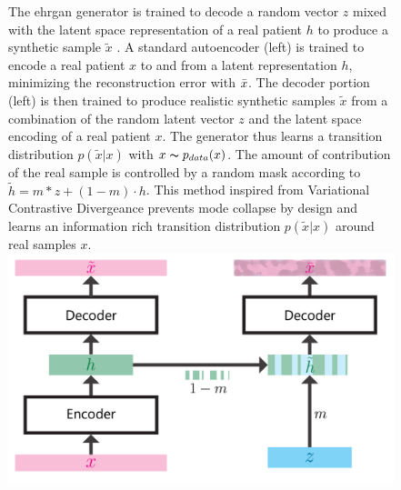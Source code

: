 \begin{figure}
    \footnotesize
\noindent
{}
\begin{tcolorbox}[sidebyside,arc=0.5mm, 
    colback=MidnightBlue!10!white, 
    coltext=MidnightBlue!90!black,  
    colframe=MidnightBlue!90!black,
    colbacktitle=MidnightBlue!80,
    leftrule=0mm,
    rightrule=0mm, 
    toprule=0mm, 
    bottomrule=0mm,
    box align=top,
    title={\begin{panel}Transitional distribution \label{pan:transitional}\end{panel}}]

The \gls{ehrgan} generator is trained to decode a random vector $z$ mixed with the latent space representation of a real patient $h$ to produce a synthetic sample $\tilde{x}$ \cite{Che_2017}. A standard autoencoder (left) is trained to encode a real patient $x$ to and from a latent representation $h$, minimizing the reconstruction error with $\Bar{x}$. The decoder portion (left) is then trained to produce realistic synthetic samples $\tilde{x}$ from a combination of the random latent vector $z$ and the latent space encoding of a real patient $x$. The generator thus learns a transition distribution $p(\tilde{x}|x)$ with $x \thicksim p_{data}(x)$. The amount of contribution of the real sample is controlled by a random mask according to $\tilde{h} =m * z + (1 - m) \cdot h$. This method inspired from Variational Contrastive Divergeance prevents mode collapse by design and  learns an information rich transition distribution $p(\tilde{x}|x)$ around real samples $x$.
\tcblower
\includegraphics[width=1\columnwidth]{assets/transitional}
\end{tcolorbox}
\normalsize
\end{figure}